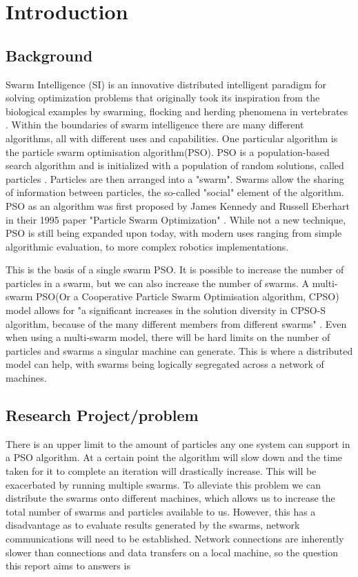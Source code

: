 \documentclass[oneside,12pt]{book}
\begin{document}

\chapter{Introduction}
\section{Background}
\par Swarm Intelligence (SI) is an innovative distributed intelligent paradigm for solving optimization problems that originally took its inspiration from the biological examples by swarming, flocking and herding phenomena in vertebrates \cite{abraham_guo_liu_2006}.
Within the boundaries of swarm intelligence there are many different algorithms, all with different uses and capabilities. One particular algorithm is the particle swarm optimisation algorithm(PSO). PSO is a population-based search algorithm and is initialized with a population of random solutions, called particles \cite{shi_2004}. Particles are then arranged into a "swarm". Swarms allow the sharing of information between particles, the so-called "social" element of the algorithm. PSO as an algorithm was first proposed by James Kennedy and Russell Eberhart in their 1995 paper "Particle Swarm Optimization" \cite{kennedy_eberhart_1995}. While not a new technique, PSO is still being expanded upon today, with modern uses ranging from simple algorithmic evaluation, to more complex robotics implementations. 

This is the basis of a single swarm PSO. It is possible to increase the number of particles in a swarm, but we can also increase the number of swarms. A multi-swarm PSO(Or a Cooperative Particle Swarm Optimisation algorithm, CPSO) model allows for "a significant increases in the solution diversity in CPSO-S algorithm, because of the many different members from different swarms" \cite{vandenbergh_engelbrecht_2004}. Even when using a multi-swarm model, there will be hard limits on the number of particles and swarms a singular machine can generate. This is where a distributed model can help, with swarms being logically segregated across a network of machines.

\section{Research Project/problem}
There is an upper limit to the amount of particles any one system can support in a PSO algorithm. At a certain point the algorithm will slow down and the time taken for it to complete an iteration will drastically increase. This will be exacerbated by running multiple swarms. 
To alleviate this problem we can distribute the swarms onto different machines, which allows us to increase the total number of swarms and particles available to us. However, this has a disadvantage as to evaluate results generated by the swarms, network communications will need to be established. Network connections are inherently slower than connections and data transfers on a local machine, so the question this report aims to answers is
\end{document}
